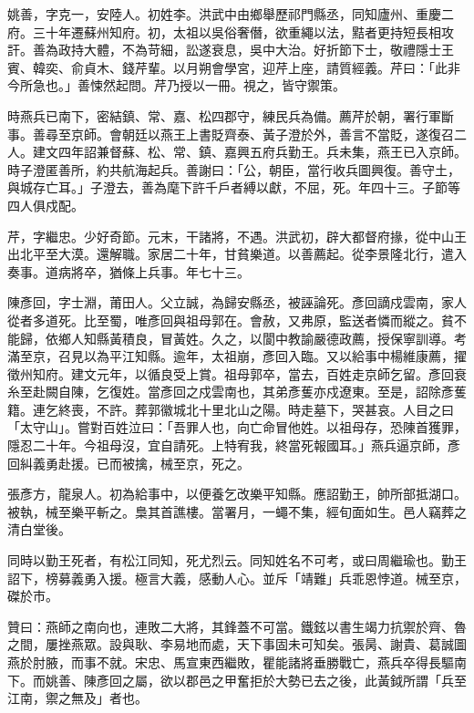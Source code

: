 \begin{pinyinscope}
姚善，字克一，安陸人。初姓李。洪武中由鄉舉歷祁門縣丞，同知廬州、重慶二府。三十年遷蘇州知府。初，太祖以吳俗奢僭，欲重繩以法，黠者更持短長相攻訐。善為政持大體，不為苛細，訟遂衰息，吳中大治。好折節下士，敬禮隱士王賓、韓奕、俞貞木、錢芹輩。以月朔會學宮，迎芹上座，請質經義。芹曰：「此非今所急也。」善悚然起問。芹乃授以一冊。視之，皆守禦策。

時燕兵已南下，密結鎮、常、嘉、松四郡守，練民兵為備。薦芹於朝，署行軍斷事。善尋至京師。會朝廷以燕王上書貶齊泰、黃子澄於外，善言不當貶，遂復召二人。建文四年詔兼督蘇、松、常、鎮、嘉興五府兵勤王。兵未集，燕王已入京師。時子澄匿善所，約共航海起兵。善謝曰：「公，朝臣，當行收兵圖興復。善守土，與城存亡耳。」子澄去，善為麾下許千戶者縛以獻，不屈，死。年四十三。子節等四人俱戍配。

芹，字繼忠。少好奇節。元末，干諸將，不遇。洪武初，辟大都督府掾，從中山王出北平至大漠。還解職。家居二十年，甘貧樂道。以善薦起。從李景隆北行，遣入奏事。道病將卒，猶條上兵事。年七十三。

陳彥回，字士淵，莆田人。父立誠，為歸安縣丞，被誣論死。彥回謫戍雲南，家人從者多道死。比至蜀，唯彥回與祖母郭在。會赦，又弗原，監送者憐而縱之。貧不能歸，依鄉人知縣黃積良，冒黃姓。久之，以閬中教諭嚴德政薦，授保寧訓導。考滿至京，召見以為平江知縣。逾年，太祖崩，彥回入臨。又以給事中楊維康薦，擢徵州知府。建文元年，以循良受上賞。祖母郭卒，當去，百姓走京師乞留。彥回衰糸至赴闕自陳，乞復姓。當彥回之戍雲南也，其弟彥蒦亦戍遼東。至是，詔除彥蒦籍。連乞終喪，不許。葬郭徽城北十里北山之陽。時走墓下，哭甚哀。人目之曰「太守山」。嘗對百姓泣曰：「吾罪人也，向亡命冒他姓。以祖母存，恐陳首獲罪，隱忍二十年。今祖母沒，宜自請死。上特宥我，終當死報國耳。」燕兵逼京師，彥回糾義勇赴援。已而被擒，械至京，死之。

張彥方，龍泉人。初為給事中，以便養乞改樂平知縣。應詔勤王，帥所部抵湖口。被執，械至樂平斬之。梟其首譙樓。當署月，一蠅不集，經旬面如生。邑人竊葬之清白堂後。

同時以勤王死者，有松江同知，死尤烈云。同知姓名不可考，或曰周繼瑜也。勤王詔下，榜募義勇入援。極言大義，感動人心。並斥「靖難」兵乖恩悖道。械至京，磔於市。

贊曰：燕師之南向也，連敗二大將，其鋒蓋不可當。鐵鉉以書生竭力抗禦於齊、魯之間，屢挫燕眾。設與耿、李易地而處，天下事固未可知矣。張昺、謝貴、葛誠圖燕於肘腋，而事不就。宋忠、馬宣東西繼敗，瞿能諸將垂勝戰亡，燕兵卒得長驅南下。而姚善、陳彥回之屬，欲以郡邑之甲奮拒於大勢已去之後，此黃鉞所謂「兵至江南，禦之無及」者也。


\end{pinyinscope}